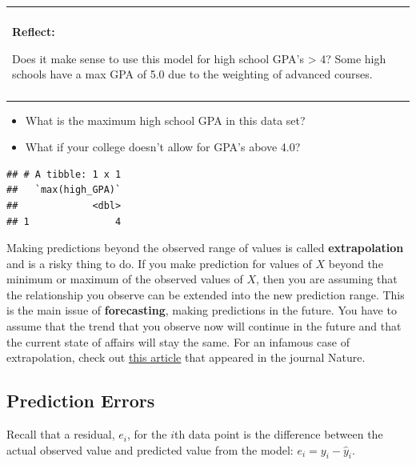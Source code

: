 \documentclass[
]{book}
\newenvironment{Shaded}{\begin{snugshade}}{\end{snugshade}}
\newcommand{\CommentTok}[1]{\textcolor[rgb]{0.56,0.35,0.01}{\textit{#1}}}
\newcommand{\KeywordTok}[1]{\textcolor[rgb]{0.13,0.29,0.53}{\textbf{#1}}}
\newcommand{\NormalTok}[1]{#1}
\newcommand{\OperatorTok}[1]{\textcolor[rgb]{0.81,0.36,0.00}{\textbf{#1}}}
\newcommand{\StringTok}[1]{\textcolor[rgb]{0.31,0.60,0.02}{#1}}
\providecommand{\tightlist}{%
  \setlength{\itemsep}{0pt}\setlength{\parskip}{0pt}}
\newenvironment{reflect}
{
    \begin{center}
    
    \begin{tabular}{|p{0.8\textwidth}|}
    \rowcolor{LightBlue}
    \hline\\
    \rowcolor{LightBlue}
    \textbf{Reflect:}
}
{
    \\\rowcolor{LightBlue}
    \\\hline
    \end{tabular} 
    \end{center}
}
\begin{document}
\begin{reflect}
Does it make sense to use this model for high school GPA's
\textgreater{} 4? Some high schools have a max GPA of 5.0 due to the
weighting of advanced courses.
\end{reflect}

\begin{itemize}
\tightlist
\item
  What is the maximum high school GPA in this data set?
\item
  What if your college doesn't allow for GPA's above 4.0?
\end{itemize}

\begin{Shaded}
\end{Shaded}

\begin{verbatim}
## # A tibble: 1 x 1
##   `max(high_GPA)`
##             <dbl>
## 1               4
\end{verbatim}

Making predictions beyond the observed range of values is called \textbf{extrapolation} and is a risky thing to do. If you make prediction for values of \(X\) beyond the minimum or maximum of the observed values of \(X\), then you are assuming that the relationship you observe can be extended into the new prediction range. This is the main issue of \textbf{forecasting}, making predictions in the future. You have to assume that the trend that you observe now will continue in the future and that the current state of affairs will stay the same. For an infamous case of extrapolation, check out \href{https://www.ncbi.nlm.nih.gov/pmc/articles/PMC3173856/}{this article} that appeared in the journal Nature.

\hypertarget{prediction-errors}{%
\subsection{Prediction Errors}\label{prediction-errors}}

Recall that a residual, \(e_i\), for the \(i\)th data point is the difference between the actual observed value and predicted value from the model: \(e_i = y_i - \hat{y}_i\).
\end{document}
